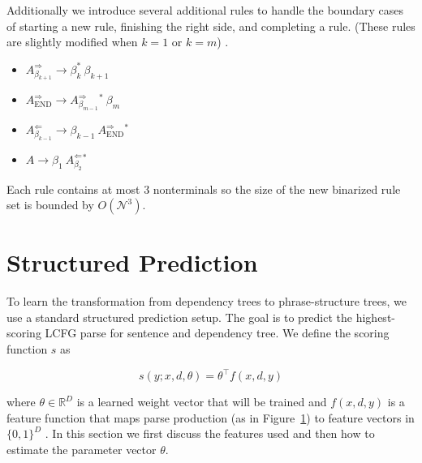 \documentclass[11pt,letterpaper]{article}
\newcommand{\nonterms}{\mathcal{N}}
\newcommand{\END}{\mathrm{END}}
\newcommand{\RuleA}[3]{#1 \rightarrow #2^*\ #3}
\newcommand{\RuleB}[3]{#1 \rightarrow #2\ #3^*}
\newcommand{\Reals}{\mathbb{R}}
\begin{document}
Additionally we introduce several additional rules to handle the boundary cases of starting a new rule, finishing the right side, and completing a rule. (These rules are slightly modified when $k=1$ or $k=m$) .

\begin{itemize}

\item $\RuleA{A^{\Rightarrow}_{\beta_{k+1}}}{\beta_k}{\beta_{k+1}} $

\item 
$\RuleA{A^{\Rightarrow}_{\END}} {A^{\Rightarrow}_{\beta_{m-1}}}{\beta_m}$

\item  $\RuleB{ A^{\Leftarrow}_{\beta_{k-1}}}{\beta_{k-1}}{A^{\Rightarrow}_{\END}}$

\item
$\RuleB{A}{\beta_1}{ A^{\Leftarrow}_{\beta_{2}}} $ 
\end{itemize}

\noindent Each rule contains at most 3 nonterminals so the size of the new binarized rule set is bounded by $O(\nonterms^3)$.    






\section{Structured Prediction}

To learn the transformation from dependency trees to phrase-structure trees, 
we use a standard structured prediction setup. 
The goal is to predict the highest-scoring LCFG parse for sentence and dependency tree. 
We define the scoring function $s$ as

\[s(y;x, d, \theta) =  \theta^{\top} f(x, d, y) \]

\noindent
where $\theta \in \Reals^D $ is a learned weight vector that will be trained and $f(x, d, y)$ is a feature function that maps parse production (as in Figure~\ref{}) to feature vectors in $\{0,1\}^D$ . In this section we first discuss the features used and then how to  estimate the parameter vector $\theta$.
\end{document}
